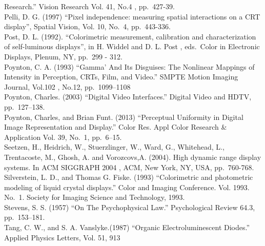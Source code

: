 \documentclass[
  letterpaper,
]{book}
\begin{document}
Research.'' Vision Research Vol. 41, No.4 , pp.~427-39.\\
Pelli, D. G. (1997) ``Pixel independence: measuring spatial interactions
on a CRT display'', Spatial Vision, Vol. 10, No.~4, pp.~443-336.\\
Post, D. L. (1992). ``Colorimetric measurement, calibration and
characterization of self-luminous displays'', in H. Widdel and D. L.
Post , eds.~Color in Electronic Displays, Plenum, NY, pp.~299 - 312.\\
Poynton, C. A. (1993) ``Gamma' And Its Disguises: The Nonlinear Mappings
of Intensity in Perception, CRTs, Film, and Video.'' SMPTE Motion
Imaging Journal, Vol.102 , No.12, pp.~1099--1108\\
Poynton, Charles. (2003) ``Digital Video Interfaces.'' Digital Video and
HDTV, pp.~127--138.\\
Poynton, Charles, and Brian Funt. (2013) ``Perceptual Uniformity in
Digital Image Representation and Display.'' Color Res. Appl Color
Research \& Application Vol. 39, No.~1, pp.~6--15.\\
Seetzen, H., Heidrich, W., Stuerzlinger, W., Ward, G., Whitehead, L.,
Trentacoste, M., Ghosh, A. and Vorozcovs,A. (2004). High dynamic range
display systems. In ACM SIGGRAPH 2004 , ACM, New York, NY, USA,
pp.~760-768.\\
Silverstein, L. D., and Thomas G. Fiske. (1993) ``Colorimetric and
photometric modeling of liquid crystal displays.'' Color and Imaging
Conference. Vol. 1993. No.~1. Society for Imaging Science and
Technology, 1993.\\
Stevens, S. S. (1957) ``On The Psychophysical Law.'' Psychological
Review 64.3, pp.~153--181.\\
Tang, C. W., and S. A. Vanslyke.(1987) ``Organic Electroluminescent
Diodes.'' Applied Physics Letters, Vol. 51, 913
\end{document}

